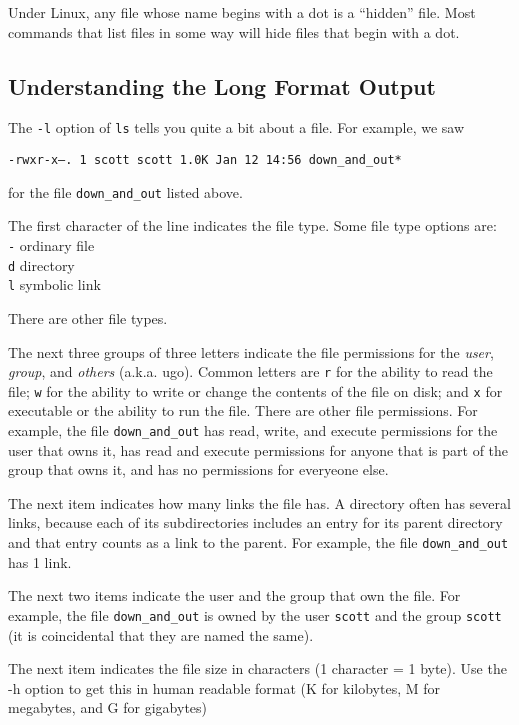 \documentclass[11pt]{cselabheader}
\begin{document}
Under Linux, any file whose name begins with a dot is a ``hidden'' file. Most
commands that list files in some way will hide files that begin with a dot.

\subsection*{Understanding the Long Format Output}

The \texttt{-l} option of \texttt{ls} tells you quite a bit about a file. 
For example, we saw 
\begin{center}
  \texttt{-rwxr-x---.  1 scott scott 1.0K Jan 12 14:56 down\_and\_out*}
\end{center}
for the file \texttt{down\_and\_out} listed above.

The first character of the line indicates the file type. Some file type options
are:
\\\texttt{-} ordinary file
\\\texttt{d} directory
\\\texttt{l} symbolic link

There are other file types.

The next three groups of three letters indicate the file permissions for the
\emph{user}, \emph{group}, and \emph{others} (a.k.a. ugo). Common letters are
\texttt{r} for the ability to read the file; \texttt{w} for the ability to write
or change the contents of the file on disk; and \texttt{x} for executable or the
ability to run the file. There are other file permissions. For example, the file
\texttt{down\_and\_out} has read, write, and execute permissions for the user
that owns it, has read and execute permissions for anyone that is part of the
group that owns it, and has no permissions for everyeone else.

The next item indicates how many links the file has. A directory often has
several links, because each of its subdirectories includes an entry for its
parent directory and that entry counts as a link to the parent. For example, the
file \texttt{down\_and\_out} has 1 link.

The next two items indicate the user and the group that own the file. For
example, the file \texttt{down\_and\_out} is owned by the user \texttt{scott}
and the group \texttt{scott} (it is coincidental that they are named the same).

The next item indicates the file size in characters (1 character = 1 byte). Use
the -h option to get this in human readable format (K for kilobytes, M for
megabytes, and G for gigabytes)
\end{document}
